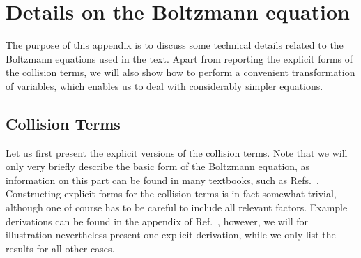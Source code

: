\section{\label{app:A:DetailsComputation}Details on the Boltzmann equation}
\renewcommand{\theequation}{A-\arabic{equation}}
\setcounter{equation}{0}  %


The purpose of this appendix is to discuss some technical details related to the Boltzmann equations used in the text. Apart from reporting the explicit forms of the collision terms, we will also show how to perform a convenient transformation of variables, which enables us to deal with considerably simpler equations.

\subsection{\label{app:coll_terms}Collision Terms}

Let us first present the explicit versions of the collision terms. Note that we will only very briefly describe the basic form of the Boltzmann equation, as information on this part can be found in many textbooks, such as Refs.~\cite{Bernstein,Kolb:1990vq}. Constructing explicit forms for the collision terms is in fact somewhat trivial, although one of course has to be careful to include all relevant factors. Example derivations can be found in the appendix of Ref.~\cite{Merle:2015oja}, however, we will for illustration nevertheless present one explicit derivation, while we only list the results for all other cases.

